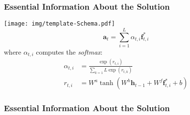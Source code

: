 

\begin{frame}
  \frametitle{Essential Information About the Solution}
  \centering\texttt{[image: img/template-Schema.pdf]}
  \begin{equation}
      \mathbf{a}_t = \sum_{i=1}^{L}\alpha_{t,i}\mathbf{f}_{t,i}^{*}
  \end{equation}
  where $\alpha_{t,i}$ computes the \emph{softmax}:
  \begin{align}
      \alpha_{t,i} &= \frac{\exp(r_{t,i})}{\sum_{k=1}{L}\exp(r_{t,k})} 
      \\
      r_{t,i} &= W^a \tanh\left( W^h \mathbf{h}_{t-1} + W^f\mathbf{f}_{t,i}^{*} + b \right)
  \end{align}
\end{frame}

\begin{frame}\frametitle{Essential Information About the Solution}
\end{frame}



